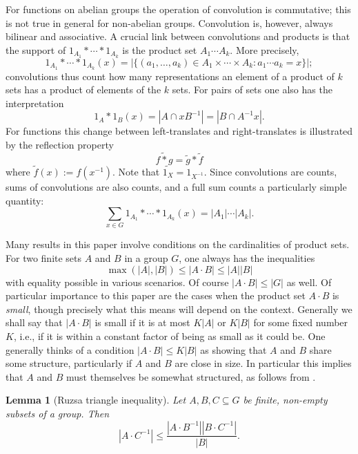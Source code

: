 \documentclass[12pt,a4paper,reqno]{amsart}
\numberwithin{equation}{section}
\theoremstyle{plain}
\newtheorem{lemma}[theorem]{Lemma}
\theoremstyle{definition}
\renewcommand{\leq}{\leqslant}
\renewcommand{\subset}{\subseteq}
\begin{document}
For functions on abelian groups the operation of convolution is commutative; this is not true in general for non-abelian groups. Convolution is, however, always bilinear and associative. A crucial link between convolutions and products is that the support of $1_{A_1} * \cdots * 1_{A_k}$ is the product set $A_1 \cdots A_k$. More precisely, 
\begin{equation}
1_{A_1} * \cdots * 1_{A_k}(x) = | \{ (a_1, \ldots, a_k) \in A_1 \times \cdots \times A_k : a_1 \cdots a_k = x \} |; \label{convolution-count} \end{equation}
convolutions thus count how many representations an element of a product of $k$ sets has a product of elements of the $k$ sets. For pairs of sets one also has the interpretation
\[ 1_A*1_B(x) = |A \cap xB^{-1}| = |B \cap A^{-1}x|. \]
For functions this change between left-translates and right-translates is illustrated by the reflection property
\begin{equation} \widetilde{f*g} = \widetilde{g}*\widetilde{f} \label{convolution-reflection} \end{equation}
where $\widetilde{f}(x) := f(x^{-1})$. Note that $\widetilde{1_X} = 1_{X^{-1}}$. Since convolutions are counts, sums of convolutions are also counts, and a full sum counts a particularly simple quantity:
\begin{equation} \sum_{x \in G} 1_{A_1} * \cdots * 1_{A_k}(x) = |A_1| \cdots |A_k|. \label{convolution_sum} \end{equation}

Many results in this paper involve conditions on the cardinalities of product sets. For two finite sets $A$ and $B$ in a group $G$, one always has the inequalities
\[ \max(|A|, |B|) \leq |A \cdot B| \leq |A||B| \]
with equality possible in various scenarios. Of course $|A \cdot B| \leq |G|$ as well. Of particular importance to this paper are the cases when the product set $A \cdot B$ is \emph{small}, though precisely what this means will depend on the context. Generally we shall say that $|A \cdot B|$ is small if it is at most $K|A|$ or $K|B|$ for some fixed number $K$, i.e., if it is within a constant factor of being as small as it could be. One generally thinks of a condition $|A \cdot B| \leq K|B|$ as showing that $A$ and $B$ share some structure, particularly if $A$ and $B$ are close in size. In particular this implies that $A$ and $B$ must themselves be somewhat structured, as follows from \cite[Lemma 3.2]{tao:non-comm}.

\begin{lemma}[Ruzsa triangle inequality]\label{triangle_inequality}
Let $A, B, C \subset G$ be finite, non-empty subsets of a group. Then
\[ |A \cdot C^{-1}| \leq \frac{|A \cdot B^{-1}| |B \cdot C^{-1}|}{|B|}. \]
\end{lemma}
\end{document}
